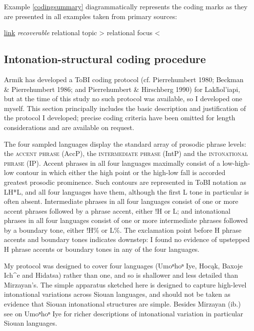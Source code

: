 \documentclass[output=paper]{LSP/langsci}
\begin{document}
Example \ref{codingsummary} diagrammatically represents the coding marks as they are presented in all examples taken from primary sources:

\ea\label{codingsummary}{\underline{link} \textit{recoverable} relational topic > relational focus <}\z

\subsection{Intonation-structural coding procedure}\label{intonationcoding}

Armik \citet{Mirzayan2011} has developed a ToBI coding protocol (cf. Pierrehumbert 1980; Beckman \& Pierrehumbert 1986; and Pierrehumbert \& Hirschberg 1990) for Lakȟol’iapi, but at the time of this study no such protocol was available, so I developed one myself. This section principally includes the basic description and justification of the protocol I developed; precise coding criteria have been omitted for length considerations and are available on request. 

The four sampled languages display the standard array of prosodic phrase levels: the \textsc{accent phrase} (AccP), the \textsc{intermediate phrase} (IntP) and the \textsc{intonational phrase} (IP). Accent phrases in all four languages maximally consist of a low-high-low contour in which either the high point or the high-low fall is accorded greatest prosodic prominence. Such contours are represented in ToBI notation as LH*L, and all four languages have them, although the first L tone in particular is often absent. Intermediate phrases in all four languages consist of one or more accent phrases followed by a phrase accent, either !H or L; and intonational phrases in all four languages consist of one or more intermediate phrases followed by a boundary tone, either !H\% or L\%. The exclamation point before H phrase accents and boundary tones indicates downstep: I found no evidence of upstepped H phrase accents or boundary tones in any of the four languages. 

My protocol was designed to cover four languages (Umoⁿhoⁿ Iye, Hocąk, Baxoje Ich\^{}e and Hidatsa) rather than one, and so is shallower and less detailed than Mirzayan’s. The simple apparatus sketched here is designed to capture high-level intonational variations across Siouan languages, and should not be taken as evidence that Siouan intonational structures are simple. Besides Mirzayan (ib.) see \citet{Larson2009} on Umoⁿhoⁿ Iye for richer descriptions of intonational variation in particular Siouan languages. 
\end{document}

